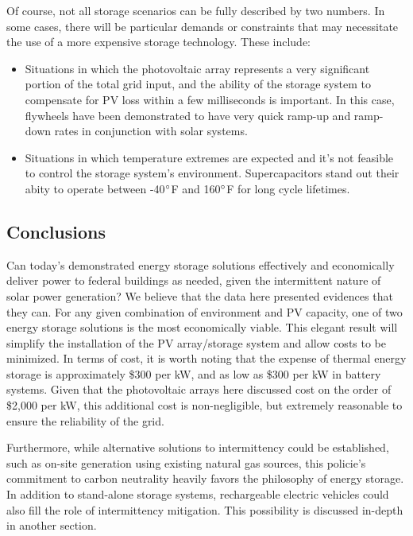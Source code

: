 Of course, not all storage scenarios can be fully described by two numbers. In
some cases, there will be particular demands or constraints that may
necessitate the use of a more expensive storage technology. These include:
\begin{itemize}
\item Situations in which the photovoltaic array represents a very significant
portion of the total grid input, and the ability of the storage system to
compensate for PV loss within a few milliseconds is important. In this case,
flywheels have been demonstrated to have very quick ramp-up and ramp-down rates
in conjunction with solar systems.
\item Situations in which temperature extremes are expected and it’s not
feasible to control the storage system’s environment. Supercapacitors stand out their abity
to operate between -40$\degree$F and 160$\degree$F for long cycle lifetimes.
\end{itemize}

\subsection{Conclusions}

Can today’s demonstrated energy storage solutions effectively and economically
deliver power to federal buildings as needed, given the intermittent nature of
solar power generation? We believe that the data here presented evidences that
they can. For any given combination of environment and PV capacity, one of two
energy storage solutions is the most economically viable. This elegant result will
simplify the installation of the PV array/storage system and allow costs to be
minimized. In terms of cost, it is worth noting that the expense of thermal energy
storage is approximately \$300 per kW, and as low as \$300 per kW in battery
systems. Given that the photovoltaic arrays here discussed cost on the order of
\$2,000 per kW, this additional cost is non-negligible, but extremely reasonable
to ensure the reliability of the grid.

Furthermore, while alternative solutions to intermittency could be established,
such as on-site generation using existing natural gas sources, this policie's
commitment to carbon neutrality heavily favors the philosophy of energy
storage. In addition to stand-alone storage systems, rechargeable electric
vehicles could also fill the role of intermittency mitigation. This possibility
is discussed in-depth in another section.
